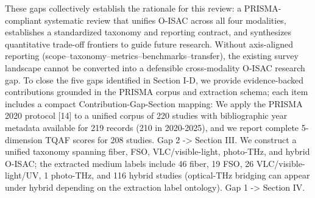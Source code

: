 {}These gaps collectively establish the rationale for this review: a PRISMA-compliant systematic review that unifies O-ISAC across all four modalities, establishes a standardized taxonomy and reporting contract, and synthesizes quantitative trade-off frontiers to guide future research.\markdownRendererInterblockSeparator
{}\markdownRendererBlockQuoteBegin
{} Without axis-aligned reporting (scope–taxonomy–metrics–benchmarks–transfer), the existing survey landscape cannot be converted into a defensible cross-modality O-ISAC research gap.\markdownRendererBlockQuoteEnd \markdownRendererParagraphSeparator
{}
\markdownRendererSectionEnd \markdownRendererSectionBegin
{}\markdownRendererInterblockSeparator
{}To close the five gaps identified in Section I-D, we provide evidence-backed contributions grounded in the PRISMA corpus and extraction schema; each item includes a compact Contribution-Gap-Section mapping:\markdownRendererInterblockSeparator
{}\markdownRendererOlBegin
{} We apply the PRISMA 2020 protocol [14] to a unified corpus of 220 studies with bibliographic year metadata available for 219 records (210 in 2020-2025), and we report complete 5-dimension TQAF scores for 208 studies.  Gap 2 -> Section III.\markdownRendererOlItemEnd 
{} We construct a unified taxonomy spanning fiber, FSO, VLC/visible-light, photo-THz, and hybrid O-ISAC; the extracted medium labels include 46 fiber, 19 FSO, 26 VLC/visible-light/UV, 1 photo-THz, and 116 hybrid studies (optical-THz bridging can appear under hybrid depending on the extraction label ontology).  Gap 1 -> Section IV.\markdownRendererOlItemEnd 
